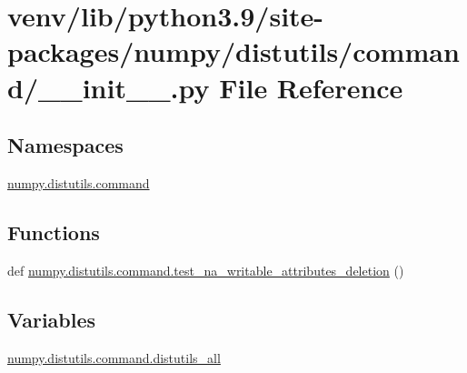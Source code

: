 \hypertarget{venv_2lib_2python3_89_2site-packages_2numpy_2distutils_2command_2____init_____8py}{}\section{venv/lib/python3.9/site-\/packages/numpy/distutils/command/\+\_\+\+\_\+init\+\_\+\+\_\+.py File Reference}
\label{venv_2lib_2python3_89_2site-packages_2numpy_2distutils_2command_2____init_____8py}
\subsection*{Namespaces}
\begin{DoxyCompactItemize}
\item 
 \hyperlink{namespacenumpy_1_1distutils_1_1command}{numpy.\+distutils.\+command}
\end{DoxyCompactItemize}
\subsection*{Functions}
\begin{DoxyCompactItemize}
\item 
def \hyperlink{namespacenumpy_1_1distutils_1_1command_ae53506b299b0bfa7b91bcdea42451e64}{numpy.\+distutils.\+command.\+test\+\_\+na\+\_\+writable\+\_\+attributes\+\_\+deletion} ()
\end{DoxyCompactItemize}
\subsection*{Variables}
\begin{DoxyCompactItemize}
\item 
\hyperlink{namespacenumpy_1_1distutils_1_1command_ac3524215abae058021eedd698191336b}{numpy.\+distutils.\+command.\+distutils\+\_\+all}
\end{DoxyCompactItemize}
